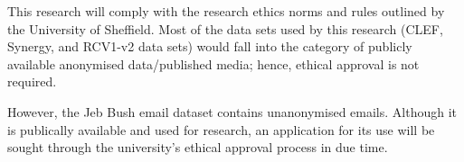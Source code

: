 \documentclass[../main.tex]{subfiles}
\begin{document}
This research will comply with the research ethics norms and rules outlined by the University of Sheffield. Most of the data sets used by this research (CLEF, Synergy, and RCV1-v2 data sets) would fall into the category of publicly available anonymised data/published media; hence, ethical approval is not required. 

However, the Jeb Bush email dataset contains unanonymised emails. Although it is publically available and used for research, an application for its use will be sought through the university's ethical approval process in due time. 
\end{document}
